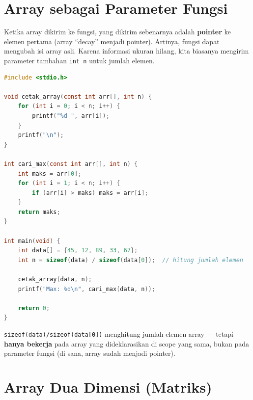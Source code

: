 \documentclass[../main.tex]{subfiles}
\begin{document}
\section{Array sebagai Parameter Fungsi}

Ketika array dikirim ke fungsi, yang dikirim sebenarnya adalah \textbf{pointer} ke elemen pertama (array ``decay'' menjadi pointer). Artinya, fungsi dapat mengubah isi array asli. Karena informasi ukuran hilang, kita biasanya mengirim parameter tambahan \texttt{int n} untuk jumlah elemen.

\begin{lstlisting}[language=C,caption=Array sebagai parameter fungsi]
#include <stdio.h>

void cetak_array(const int arr[], int n) {
    for (int i = 0; i < n; i++) {
        printf("%d ", arr[i]);
    }
    printf("\n");
}

int cari_max(const int arr[], int n) {
    int maks = arr[0];
    for (int i = 1; i < n; i++) {
        if (arr[i] > maks) maks = arr[i];
    }
    return maks;
}

int main(void) {
    int data[] = {45, 12, 89, 33, 67};
    int n = sizeof(data) / sizeof(data[0]);  // hitung jumlah elemen
    
    cetak_array(data, n);
    printf("Max: %d\n", cari_max(data, n));
    
    return 0;
}
\end{lstlisting}

\begin{catatan}
\texttt{sizeof(data)/sizeof(data[0])} menghitung jumlah elemen array --- tetapi \textbf{hanya bekerja} pada array yang dideklarasikan di scope yang sama, bukan pada parameter fungsi (di sana, array sudah menjadi pointer).
\end{catatan}



\section{Array Dua Dimensi (Matriks)}
\end{document}
